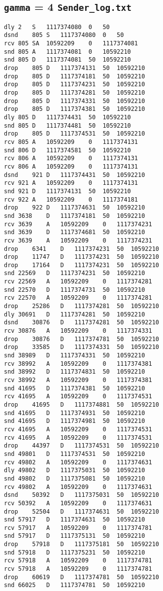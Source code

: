 \documentclass[a4paper]{article}
\begin{document}
\subsection{\texttt{gamma} = 4 \texttt{Sender\_log.txt}}
\begin{lstlisting}
dly	2	S	1117374080	0	50
dsnd	805	S	1117374080	0	50
rcv	805	SA	10592209	0	1117374081
snd	805	A	1117374081	0	10592210
snd	805	D	1117374081	50	10592210
drop	805	D	1117374131	50	10592210
drop	805	D	1117374181	50	10592210
drop	805	D	1117374231	50	10592210
drop	805	D	1117374281	50	10592210
drop	805	D	1117374331	50	10592210
drop	805	D	1117374381	50	10592210
dly	805	D	1117374431	50	10592210
snd	805	D	1117374481	50	10592210
drop	805	D	1117374531	50	10592210
rcv	805	A	10592209	0	1117374131
snd	806	D	1117374581	50	10592210
rcv	806	A	10592209	0	1117374131
rcv	806	A	10592209	0	1117374131
dsnd	921	D	1117374431	50	10592210
rcv	921	A	10592209	0	1117374131
snd	921	D	1117374131	50	10592210
rcv	922	A	10592209	0	1117374181
drop	922	D	1117374631	50	10592210
snd	3638	D	1117374181	50	10592210
rcv	3639	A	10592209	0	1117374231
snd	3639	D	1117374681	50	10592210
rcv	3639	A	10592209	0	1117374231
drop	6341	D	1117374231	50	10592210
drop	11747	D	1117374231	50	10592210
drop	17164	D	1117374231	50	10592210
snd	22569	D	1117374231	50	10592210
rcv	22569	A	10592209	0	1117374281
snd	22570	D	1117374731	50	10592210
rcv	22570	A	10592209	0	1117374281
drop	25286	D	1117374281	50	10592210
dly	30691	D	1117374281	50	10592210
dsnd	30876	D	1117374281	50	10592210
rcv	30876	A	10592209	0	1117374331
drop	30876	D	1117374781	50	10592210
drop	33585	D	1117374331	50	10592210
snd	38989	D	1117374331	50	10592210
rcv	38992	A	10592209	0	1117374381
snd	38992	D	1117374831	50	10592210
rcv	38992	A	10592209	0	1117374381
snd	41695	D	1117374381	50	10592210
rcv	41695	A	10592209	0	1117374531
drop	41695	D	1117374881	50	10592210
snd	41695	D	1117374931	50	10592210
snd	41695	D	1117374981	50	10592210
rcv	41695	A	10592209	0	1117374531
rcv	41695	A	10592209	0	1117374531
drop	44397	D	1117374531	50	10592210
snd	49801	D	1117374531	50	10592210
rcv	49802	A	10592209	0	1117374631
dly	49802	D	1117375031	50	10592210
snd	49802	D	1117375081	50	10592210
rcv	49802	A	10592209	0	1117374631
dsnd	50392	D	1117375031	50	10592210
rcv	50392	A	10592209	0	1117374631
drop	52504	D	1117374631	50	10592210
snd	57917	D	1117374631	50	10592210
rcv	57917	A	10592209	0	1117374781
snd	57917	D	1117375131	50	10592210
drop	57918	D	1117375181	50	10592210
snd	57918	D	1117375231	50	10592210
rcv	57918	A	10592209	0	1117374781
rcv	57918	A	10592209	0	1117374781
drop	60619	D	1117374781	50	10592210
snd	66025	D	1117374781	50	10592210

\end{lstlisting}
\end{document}
